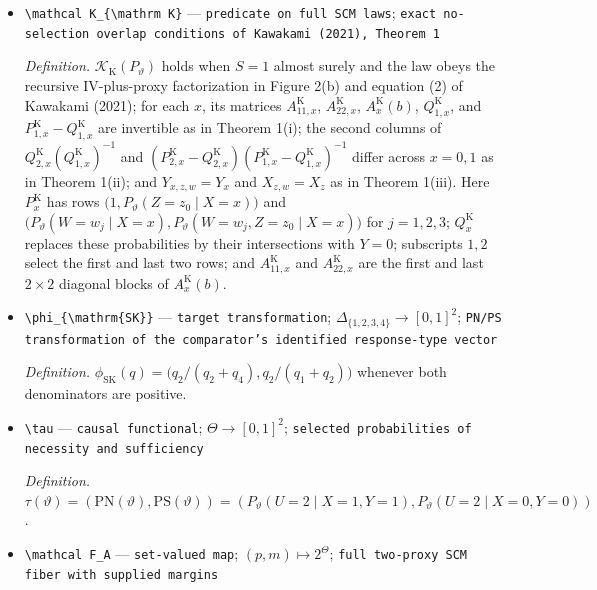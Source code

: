 \documentclass{article}
\begin{document}
\begin{itemize}
  \item \texttt{\textbackslash{}\allowbreak{}mathcal K\_\allowbreak{}\{\textbackslash{}\allowbreak{}mathrm K\}\allowbreak{}} --- \texttt{predicate on full SCM laws}; \texttt{exact no-\allowbreak{}selection overlap conditions of Kawakami (2021),\allowbreak{} Theorem 1}
  \par\smallskip\noindent\emph{Definition.} \(\mathcal K_{\mathrm K}(P_{\vartheta})\) holds when \(S=1\) almost surely and the law obeys the recursive IV-plus-proxy factorization in Figure 2(b) and equation (2) of Kawakami (2021); for each \(x\), its matrices \(A_{11,x}^{\mathrm K}\), \(A_{22,x}^{\mathrm K}\), \(A_x^{\mathrm K}(b)\), \(Q_{1,x}^{\mathrm K}\), and \(P_{1,x}^{\mathrm K}-Q_{1,x}^{\mathrm K}\) are invertible as in Theorem 1(i); the second columns of \(Q_{2,x}^{\mathrm K}(Q_{1,x}^{\mathrm K})^{-1}\) and \((P_{2,x}^{\mathrm K}-Q_{2,x}^{\mathrm K})(P_{1,x}^{\mathrm K}-Q_{1,x}^{\mathrm K})^{-1}\) differ across \(x=0,1\) as in Theorem 1(ii); and \(Y_{x,z,w}=Y_x\) and \(X_{z,w}=X_z\) as in Theorem 1(iii). Here \(P_x^{\mathrm K}\) has rows \(\bigl(1,P_{\vartheta}(Z=z_0\mid X=x)\bigr)\) and \(\bigl(P_{\vartheta}(W=w_j\mid X=x),P_{\vartheta}(W=w_j,Z=z_0\mid X=x)\bigr)\) for \(j=1,2,3\); \(Q_x^{\mathrm K}\) replaces these probabilities by their intersections with \(Y=0\); subscripts \(1,2\) select the first and last two rows; and \(A_{11,x}^{\mathrm K}\) and \(A_{22,x}^{\mathrm K}\) are the first and last \(2\times2\) diagonal blocks of \(A_x^{\mathrm K}(b)\).
  \item \texttt{\textbackslash{}\allowbreak{}phi\_\allowbreak{}\{\textbackslash{}\allowbreak{}mathrm\{SK\}\allowbreak{}\}\allowbreak{}} --- \texttt{target transformation}; \(\Delta_{\{1,2,3,4\}}\to[0,1]^2\); \texttt{PN/\allowbreak{}PS transformation of the comparator's identified response-\allowbreak{}type vector}
  \par\smallskip\noindent\emph{Definition.} \(\phi_{\mathrm{SK}}(q)=\bigl(q_2/(q_2+q_4),q_2/(q_1+q_2)\bigr)\) whenever both denominators are positive.
  \item \texttt{\textbackslash{}\allowbreak{}tau} --- \texttt{causal functional}; \(\Theta\to[0,1]^2\); \texttt{selected probabilities of necessity and sufficiency}
  \par\smallskip\noindent\emph{Definition.} \(\tau(\vartheta)=(\mathrm{PN}(\vartheta),\mathrm{PS}(\vartheta))=(P_{\vartheta}(U=2\mid X=1,Y=1),P_{\vartheta}(U=2\mid X=0,Y=0))\).
  \item \texttt{\textbackslash{}\allowbreak{}mathcal F\_\allowbreak{}A} --- \texttt{set-\allowbreak{}valued map}; \((p,m)\mapsto 2^{\Theta}\); \texttt{full two-\allowbreak{}proxy SCM fiber with supplied margins}

\end{itemize}
\end{document}
